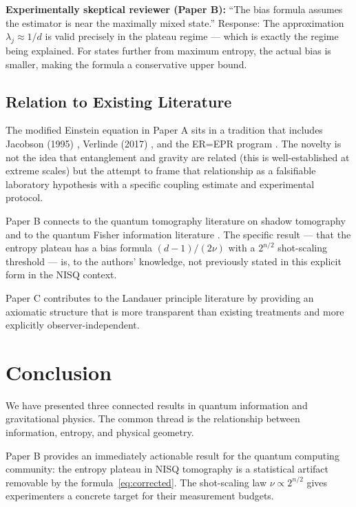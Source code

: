 \documentclass[12pt,letterpaper]{article}
\theoremstyle{plain}
\theoremstyle{definition}
\theoremstyle{remark}
\begin{document}
\textbf{Experimentally skeptical reviewer (Paper B):} ``The bias formula
assumes the estimator is near the maximally mixed state.'' Response: The
approximation $\lambda_j \approx 1/d$ is valid precisely in the plateau
regime --- which is exactly the regime being explained. For states further
from maximum entropy, the actual bias is smaller, making the formula a
conservative upper bound.

\subsection{Relation to Existing Literature}

The modified Einstein equation in Paper A sits in a tradition that
includes Jacobson (1995) \cite{jacobson1995}, Verlinde (2017)
\cite{verlinde2017}, and the ER=EPR program \cite{maldacena2013}.
The novelty is not the idea that entanglement and gravity are related
(this is well-established at extreme scales) but the attempt to frame
that relationship as a falsifiable laboratory hypothesis with a specific
coupling estimate and experimental protocol.

Paper B connects to the quantum tomography literature on shadow tomography
\cite{huang2020} and to the quantum Fisher information literature
\cite{paris2009}. The specific result --- that the entropy plateau has a
bias formula $(d-1)/(2\nu)$ with a $2^{n/2}$ shot-scaling threshold ---
is, to the authors' knowledge, not previously stated in this explicit
form in the NISQ context.

Paper C contributes to the Landauer principle literature
\cite{landauer1961, bennett2003, parrondo2015} by providing an axiomatic
structure that is more transparent than existing treatments and more
explicitly observer-independent.

\section{Conclusion}
\label{sec:conclusion}

We have presented three connected results in quantum information and
gravitational physics. The common thread is the relationship between
information, entropy, and physical geometry.

Paper B provides an immediately actionable result for the quantum
computing community: the entropy plateau in NISQ tomography is a
statistical artifact removable by the formula~\eqref{eq:corrected}.
The shot-scaling law $\nu\propto 2^{n/2}$ gives experimenters a concrete
target for their measurement budgets.
\end{document}
